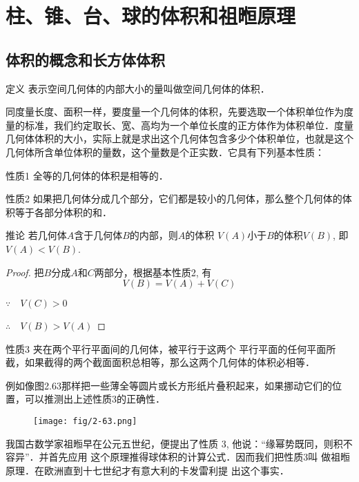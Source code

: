 \section{柱、锥、台、球的体积和祖暅原理}

\subsection{体积的概念和长方体体积}
\begin{blk}
    {定义} 表示空间几何体的内部大小的量叫做空间几何体的体积．
\end{blk}

同度量长度、面积一样，要度量一个几何体的体积，先要选取一个体积单位作为度量的标准，我们约定取长、宽、高均为一个单位长度的正方体作为体积单位．度量几何体体积的大小，实际上就是求出这个几何体包含多少个体积单位，也就是这个几何体所含单位体积的量数，这个量数是个正实数．它具有下列基本性质：

\begin{blk}{性质1}
    全等的几何体的体积是相等的．
\end{blk}


\begin{blk}{性质2}
    如果把几何体分成几个部分，它们都是较小的几何体，那么整个几何体的体积等于各部分体积的和．
\end{blk}

\begin{blk}
  {推论} 若几何体$A$含于几何体$B$的内部，则$A$的体积
$V(A)$小于$B$的体积$V(B)$, 即$V(A)<V(B)$.  
\end{blk}

\begin{proof}
 把$B$分成$A$和$C$两部分，根据基本性质2, 有
\[V(B)=V(A)+V(C)\]

$\because\quad V (C) > 0$

$\therefore\quad  V (B) > V (A)$   
\end{proof}

\begin{blk}{性质3}
    夹在两个平行平面间的几何体，被平行于这两个
平行平面的任何平面所截，如果截得的两个截面面积总相等，那么这两个几何体的体积必相等．
\end{blk}

例如像图2.63那样把一些薄全等圆片或长方形纸片叠积起来，如果挪动它们的位置，可以推测出上述性质3的正确性．
\begin{figure}[htp]
    \centering
\texttt{[image: fig/2-63.png]}
    \caption{}
\end{figure}

我国古数学家祖暅早在公元五世纪，便提出了性质
3, 他说：“缘幂势既同，则积不容异”．并首先应用
这个原理推得球体积的计算公式．因而我们把性质3叫
做祖暅原理．在欧洲直到十七世纪才有意大利的卡发雷利提
出这个事实．

